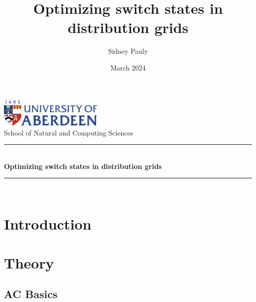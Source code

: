 \documentclass[a4paper]{report}
\title{Optimizing switch states in distribution grids}
\author{Sidney Pauly}
\date{March 2024}
\newcommand{\HRule}[1]{\rule{\linewidth}{#1}}
\begin{document}
\begin{titlepage}
	
	\begin{center}
		\includegraphics[width=50mm]{img/ABDN.png}\\[.5cm]
		School of Natural and Computing Sciences\\
		\HRule{2pt} \\
		\LARGE \textbf{Optimizing switch states in distribution grids}
		\HRule{2pt} \\ [0.5cm]
	\end{center}


\end{titlepage}

		
\tableofcontents

\chapter{Introduction}




\chapter{Theory}


\section{AC Basics}
\end{document}
